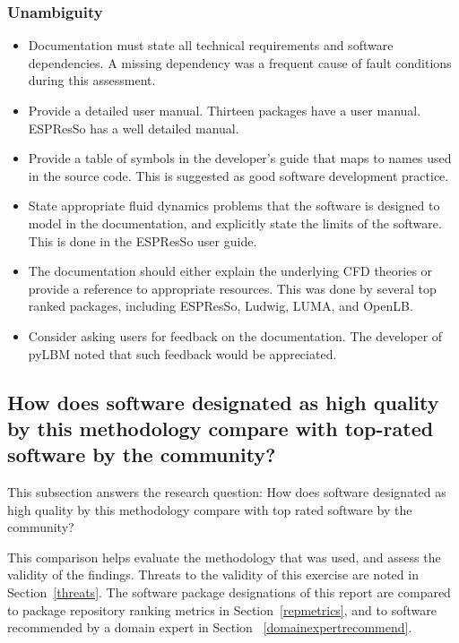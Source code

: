 \documentclass[final, 3p, times, authoryear]{elsarticle}
\begin{document}
\subsubsection{Unambiguity}

\begin{itemize}
	\item Documentation must state all technical requirements and software
	dependencies. A missing dependency was a frequent cause of fault conditions
	during this assessment.
	\item Provide a detailed user manual. Thirteen packages have a user manual.
	ESPResSo has a well detailed manual.
	\item Provide a table of symbols in the developer's guide that maps to names
	used in the source code. This is suggested as good software development
	practice.
	\item State appropriate fluid dynamics problems that the software is
	designed to model in the documentation, and explicitly state the limits of
	the software. This is done in the ESPResSo user guide.
	\item The documentation should either explain the underlying CFD theories or
	provide a reference to appropriate resources. This was done by several top
	ranked packages, including ESPResSo, Ludwig, LUMA, and OpenLB.
	\item Consider asking users for feedback on the documentation. The developer
	of pyLBM noted that such feedback would be appreciated.
\end{itemize}

\subsection{How does software designated as high quality by this methodology
compare with top-rated software by the community?} \label{comparison}

This subsection answers the research question: How does software designated as
high quality by this methodology compare with top rated software by the
community?

This comparison helps evaluate the methodology that was used, and assess the
validity of the findings. Threats to the validity of this exercise are noted in
Section~\ref{threats}. The software package designations of this report are
compared to package repository ranking metrics in Section~\ref{repmetrics}, and
to software recommended by a domain expert in Section
~\ref{domainexpertrecommend}.
\end{document}

